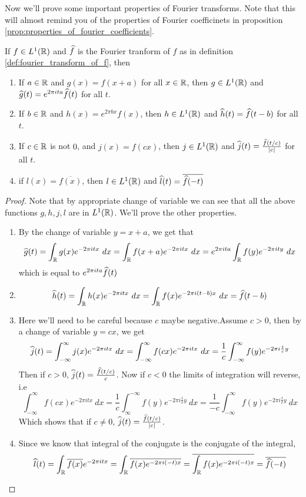   Now we'll prove some important properties of Fourier transforms. Note that this will almost remind you of the properties of Fourier coefficinets in proposition \ref{prop:properties_of_fourier_coefficients}. 
  \begin{proposition}
    \label{prop:properties_of_fourier_transform}
    If $f\in L^1(\mathbb R)$ and $\widehat{f}$ is the Fourier tranform of $f$ as in definition \ref{def:fourier_transform_of_f}, then 
    \begin{enumerate}[label=(\alph*)]
      \item If $a \in \mathbb R$ and $g(x) = f(x+a)$ for all $x \in \mathbb R$, then $g \in L^1(\mathbb R)$ and $\widehat{g}(t) = e^{2\pi ita} \widehat{f}(t)$ for all $t$.
      \item If $b \in \mathbb R$ and $h(x) = e^{2\pi bx}f(x)$, then $h \in L^1(\mathbb R)$ and $\widehat{h}(t) = \widehat{f}(t-b)$ for all $t$.
      \item If $c \in \mathbb R$ is not $0$, and $j(x) = f(cx)$, then $j \in L^1(\mathbb R)$ and $\widehat{j}(t) = \frac{\widehat{f}(t/c)}{|c|}$ for all $t$.
      \item if $l(x) = \overline{f(x)}$, then $l\in L^1(\mathbb R)$ and $\widehat{l}(t) = \overline{\widehat{f}(-t)}$
    \end{enumerate}
  \end{proposition}

  \begin{proof}
    Note that by appropriate change of variable we can see that all the above functions $g, h, j, l$ are in $L^1(\mathbb R)$. We'll prove the other properties.
    \begin{enumerate}[label=(\alph*)]
      \item By the change of variable $y = x+a$, we get that
        $$\widehat{g}(t) = \int_{\mathbb R}g(x)e^{-2 \pi itx} \ dx = \int_\mathbb R f(x+a)e^{-2\pi itx} \ dx = e^{2\pi ita}\int_\mathbb R f(y)e^{-2 \pi ity} \ dx$$
        which is equal to $e^{2\pi ita}\widehat{f}(t)$

      \item $$\widehat{h}(t) = \int_{\mathbb R}h(x)e^{-2\pi itx} \ dx = \int_\mathbb R f(x)e^{-2\pi i(t-b)x} \ dx = \widehat{f}(t-b)$$

      \item Here we'll need to be careful because $c$ maybe negative.Assume $c>0$, then by a change of variable $y=cx$, we get $$\widehat{j}(t) = \int_{-\infty}^{\infty} j(x)e^{-2\pi itx} \ dx = \int_{-\infty}^{\infty} f(cx)e^{-2\pi itx} \ dx = \frac{1}{c}\int_{-\infty}^{\infty} f(y)e^{-2\pi i \frac{t}{c}y} $$
        Then if $c>0$, $\widehat{j}(t) = \frac{\widehat{f}(t/c)}{c}$. Now if $c<0$ the limits of integration will reverse, i.e $$\int_{-\infty}^{\infty} f(cx)e^{-2\pi itx} \ dx = \frac{1}{c}\int_{\infty}^{-\infty} f(y)e^{-2\pi i \frac{t}{c}y} \ dx = \frac{1}{-c}\int_{-\infty}^{\infty} f(y)e^{-2\pi i \frac{t}{c}y} \ dx$$
        Which shows that if $c\neq 0$, $\widehat{j}(t) = \frac{\widehat{f}(t/c)}{|c|}$.
      \item Since we know that integral of the conjugate is the conjugate of the integral, $$\widehat{l}(t) = \int_\mathbb R \overline{f(x)} e^{-2\pi itx} = \int_\mathbb R \overline{f(x) e^{-2\pi i(-t)x}} = \overline{\int_\mathbb R f(x) e^{-2\pi i(-t)x}} = \overline{\widehat{f}(-t)}$$
    \end{enumerate}
  \end{proof}

